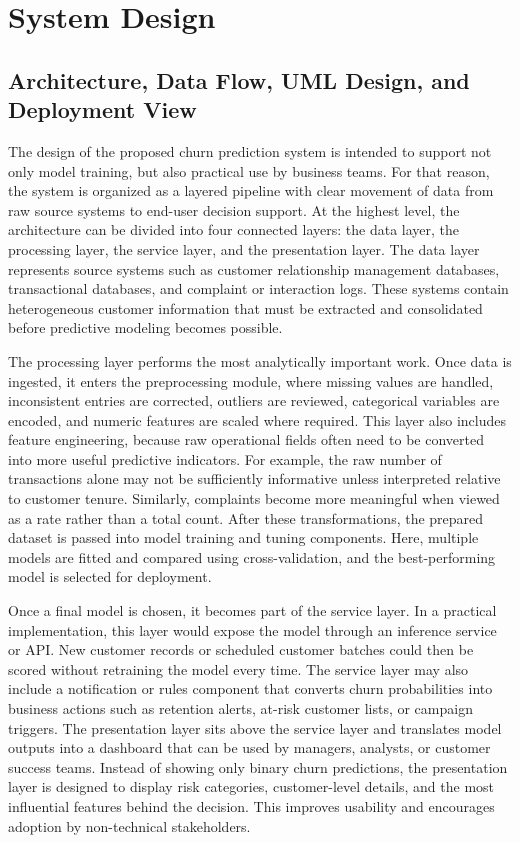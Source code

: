 \chapter{System Design}

\section{Architecture, Data Flow, UML Design, and Deployment View}
The design of the proposed churn prediction system is intended to support not only model training, but also practical use by business teams. For that reason, the system is organized as a layered pipeline with clear movement of data from raw source systems to end-user decision support. At the highest level, the architecture can be divided into four connected layers: the data layer, the processing layer, the service layer, and the presentation layer. The data layer represents source systems such as customer relationship management databases, transactional databases, and complaint or interaction logs. These systems contain heterogeneous customer information that must be extracted and consolidated before predictive modeling becomes possible.

The processing layer performs the most analytically important work. Once data is ingested, it enters the preprocessing module, where missing values are handled, inconsistent entries are corrected, outliers are reviewed, categorical variables are encoded, and numeric features are scaled where required. This layer also includes feature engineering, because raw operational fields often need to be converted into more useful predictive indicators. For example, the raw number of transactions alone may not be sufficiently informative unless interpreted relative to customer tenure. Similarly, complaints become more meaningful when viewed as a rate rather than a total count. After these transformations, the prepared dataset is passed into model training and tuning components. Here, multiple models are fitted and compared using cross-validation, and the best-performing model is selected for deployment.

Once a final model is chosen, it becomes part of the service layer. In a practical implementation, this layer would expose the model through an inference service or API. New customer records or scheduled customer batches could then be scored without retraining the model every time. The service layer may also include a notification or rules component that converts churn probabilities into business actions such as retention alerts, at-risk customer lists, or campaign triggers. The presentation layer sits above the service layer and translates model outputs into a dashboard that can be used by managers, analysts, or customer success teams. Instead of showing only binary churn predictions, the presentation layer is designed to display risk categories, customer-level details, and the most influential features behind the decision. This improves usability and encourages adoption by non-technical stakeholders.

